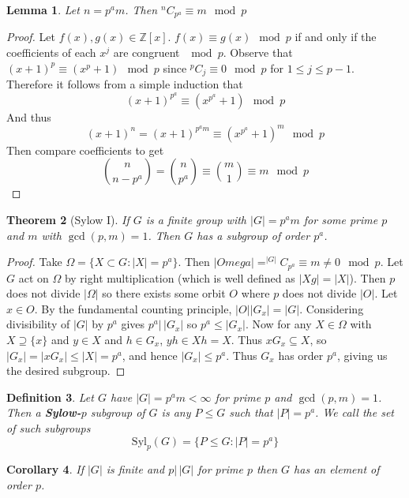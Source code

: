 \documentclass[a4paper,10pt]{article}
\newcommand{\ZZ}{\mathbb{Z}}
\newtheorem{thm}{Theorem}
\newtheorem{Def}[thm]{Definition}
\newtheorem{Cor}[thm]{Corollary}
\newtheorem{Lem}[thm]{Lemma}
\begin{document}
\begin{Lem}
Let $n = p^a m$. Then $^nC_{p^a} \equiv m \mod p$
\end{Lem}

\begin{proof}
Let $f(x), g(x) \in \ZZ[x]$. $f(x) \equiv g(x) \mod p$ if and only if the coefficients of each $x^j$ are congruent $\mod p$. Observe that $(x + 1)^p \equiv (x^p + 1) \mod p$ since $^pC_j \equiv 0 \mod p$ for $1 \leq j \leq p-1$. Therefore it follows from a simple induction that 
\[ (x+ 1)^{p^a} \equiv (x^{p^a} + 1) \mod p \]
And thus
\[ (x+1)^n = (x+1)^{p^a m} \equiv (x^{p^a} + 1)^m \mod p \]
Then compare coefficients to get
\[ \binom{n}{n - p^a} = \binom{n}{p^a} \equiv \binom{m}{1} \equiv m \mod p \]
\end{proof}

\begin{thm}[Sylow I]
If $G$ is a finite group with $|G| = p^a m$ for some prime $p$ and $m$ with $\gcd(p,m)= 1$. Then $G$ has a subgroup of order $p^a$.
\end{thm}

\begin{proof}
Take $\Omega = \{ X \subset G : |X| = p^a \}$. Then $|Omega| = ^{|G|}C_{p^a} \equiv m \neq 0 \mod p$. Let $G$ act on $\Omega$ by right multiplication (which is well defined as $|Xg| = |X|$). Then $p$ does not divide $|\Omega|$ so there exists some orbit $O$ where $p$ does not divide $|O|$. Let $x \in O$. By the fundamental counting principle, $|O| |G_x| = |G|$. Considering divisibility of $|G|$ by $p^a$ gives $p^a \big| \, |G_x|$ so $p^a \leq |G_x|$. Now for any $X \in \Omega$ with $X \supseteq \{x\}$ and $y \in X$ and $h \in G_x$, $yh \in Xh = X$. Thus $xG_x \subseteq X$, so $|G_x| = |xG_x| \leq |X| = p^a$, and hence $|G_x| \leq p^a$. Thus $G_x$ has order $p^a$, giving us the desired subgroup.    
\end{proof}

\begin{Def}
Let $G$ have $|G| = p^a m < \infty$ for prime $p$ and $\gcd(p,m) = 1$. Then a \textbf{Sylow-$p$} subgroup of $G$ is any $P \leq G$ such that $|P| = p^a$. We call the set of such subgroups
\[ \text{Syl}_p(G) = \{ P \leq G : |P| = p^a \} \]
\end{Def}


\begin{Cor}
If $|G|$ is finite and $p \big| \, |G|$ for prime $p$ then $G$ has an element of order $p$. 
\end{Cor}
\end{document}
